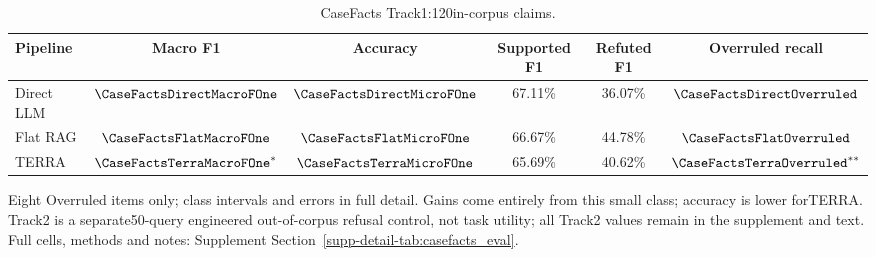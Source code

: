 \begin{table}[!t]
\caption{CaseFacts Track1:120in-corpus claims.}
\label{tab:casefacts_eval}
\centering\begingroup\fontsize{8}{9.6}\selectfont\setlength{\tabcolsep}{3pt}\renewcommand{\arraystretch}{1.15}
\begin{tabular}{lccccc}
\toprule
Pipeline & Macro F1 & Accuracy & Supported F1 & Refuted F1 & Overruled recall \\
\midrule
Direct LLM & $\CaseFactsDirectMacroFOne$ & $\CaseFactsDirectMicroFOne$ & 67.11\% & 36.07\% & $\CaseFactsDirectOverruled$ \\
Flat RAG & $\CaseFactsFlatMacroFOne$ & $\CaseFactsFlatMicroFOne$ & 66.67\% & 44.78\% & $\CaseFactsFlatOverruled$ \\
TERRA & $\CaseFactsTerraMacroFOne^*$ & $\CaseFactsTerraMicroFOne$ & 65.69\% & 40.62\% & $\CaseFactsTerraOverruled^{**}$ \\
\bottomrule
\end{tabular}
\endgroup\par\vspace{2pt}
\raggedright\footnotesize Eight Overruled items only; class intervals and errors in full detail. Gains come entirely from this small class; accuracy is lower forTERRA. Track2 is a separate50-query engineered out-of-corpus refusal control, not task utility; all Track2 values remain in the supplement and text. Full cells, methods and notes: Supplement Section~\ref{supp-detail-tab:casefacts_eval}.
\end{table}
